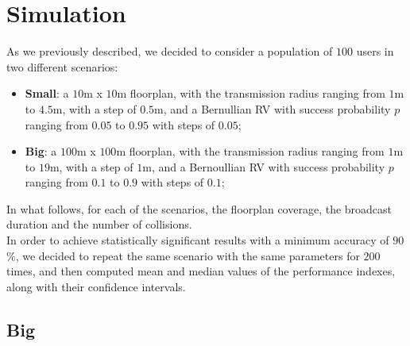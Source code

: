 %
\chapter{Simulation}\label{simulation}
As we previously described, we decided to consider a population of $100$ users
in two different scenarios:
\begin{itemize}
    \item \textbf{Small}: a $10$m x $10$m floorplan, with the transmission
    radius ranging from $1$m to $4.5$m, with a step of $0.5$m, and a Bernullian
    RV with success probability $p$ ranging from $0.05$ to $0.95$ with steps of
    $0.05$;
    \item \textbf{Big}: a $100$m x $100$m floorplan, with the transmission
    radius ranging from $1$m to $19$m, with a step of $1$m, and a Bernoullian RV
    with success probability $p$ ranging from $0.1$ to $0.9$ with steps of $0.1$;
\end{itemize}
In what follows, for each of the scenarios, the floorplan coverage, the
broadcast duration and the number of collisions.\\
In order to achieve statistically significant results with a minimum accuracy of
$90$\%, we decided to repeat the same scenario with the same parameters for
$200$ times, and then computed mean and median values of the performance
indexes, along with their confidence intervals.
\section{Big}\label{big}
